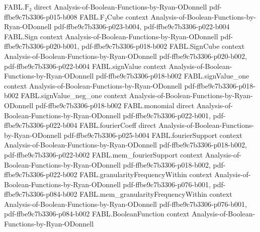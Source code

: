 \begin{theorem}
\label{FABL.booleanInfluence_andFunction}
\leanok
{}
\proofstep
  {FABL.𝔽₂}
  {direct}
  {Analysis-of-Boolean-Functions-by-Ryan-ODonnell}
  {pdf-ffbe9c7b3306-p015-b008}
\proofstep
  {FABL.F₂Cube}
  {context}
  {Analysis-of-Boolean-Functions-by-Ryan-ODonnell}
  {pdf-ffbe9c7b3306-p023-b004,
    pdf-ffbe9c7b3306-p022-b004}
\proofstep
  {FABL.Sign}
  {context}
  {Analysis-of-Boolean-Functions-by-Ryan-ODonnell}
  {pdf-ffbe9c7b3306-p020-b001,
    pdf-ffbe9c7b3306-p018-b002}
\proofstep
  {FABL.SignCube}
  {context}
  {Analysis-of-Boolean-Functions-by-Ryan-ODonnell}
  {pdf-ffbe9c7b3306-p020-b002,
    pdf-ffbe9c7b3306-p022-b004}
\proofstep
  {FABL.signValue}
  {context}
  {Analysis-of-Boolean-Functions-by-Ryan-ODonnell}
  {pdf-ffbe9c7b3306-p018-b002}
\proofstep
  {FABL.signValue_one}
  {context}
  {Analysis-of-Boolean-Functions-by-Ryan-ODonnell}
  {pdf-ffbe9c7b3306-p018-b002}
\proofstep
  {FABL.signValue_neg_one}
  {context}
  {Analysis-of-Boolean-Functions-by-Ryan-ODonnell}
  {pdf-ffbe9c7b3306-p018-b002}
\proofstep
  {FABL.monomial}
  {direct}
  {Analysis-of-Boolean-Functions-by-Ryan-ODonnell}
  {pdf-ffbe9c7b3306-p022-b001,
    pdf-ffbe9c7b3306-p022-b004}
\proofstep
  {FABL.fourierCoeff}
  {direct}
  {Analysis-of-Boolean-Functions-by-Ryan-ODonnell}
  {pdf-ffbe9c7b3306-p025-b004}
\proofstep
  {FABL.fourierSupport}
  {context}
  {Analysis-of-Boolean-Functions-by-Ryan-ODonnell}
  {pdf-ffbe9c7b3306-p018-b002,
    pdf-ffbe9c7b3306-p022-b002}
\proofstep
  {FABL.mem_fourierSupport}
  {context}
  {Analysis-of-Boolean-Functions-by-Ryan-ODonnell}
  {pdf-ffbe9c7b3306-p018-b002,
    pdf-ffbe9c7b3306-p022-b002}
\proofstep
  {FABL.granularityFrequencyWithin}
  {context}
  {Analysis-of-Boolean-Functions-by-Ryan-ODonnell}
  {pdf-ffbe9c7b3306-p076-b001,
    pdf-ffbe9c7b3306-p084-b002}
\proofstep
  {FABL.mem_granularityFrequencyWithin}
  {context}
  {Analysis-of-Boolean-Functions-by-Ryan-ODonnell}
  {pdf-ffbe9c7b3306-p076-b001,
    pdf-ffbe9c7b3306-p084-b002}
\proofstep
  {FABL.BooleanFunction}
  {context}
  {Analysis-of-Boolean-Functions-by-Ryan-ODonnell}

\end{theorem}
